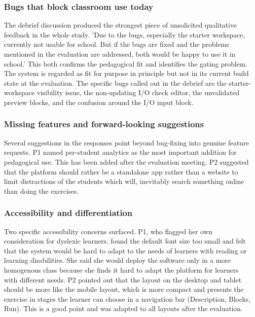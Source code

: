 \subsubsection*{Bugs that block classroom use today}
The debrief discussion produced the strongest piece of unsolicited qualitative feedback in the whole study.
'Due to the bugs, especially the starter workspace, currently not usable for school. But if the bugs are fixed and the 
problems mentioned in the evaluation are addressed, both would be happy to use it in school.' 
This both confirms the pedagogical fit and identifies the gating problem.
The system is regarded as fit for purpose in principle but not in its current build state at the evaluation. 
The specific bugs called out in the debrief are the starter-workspace visibility issue, the non-updating I/O check editor, 
the unvalidated preview blocks, and the confusion around the I/O input block.

\subsubsection*{Missing features and forward-looking suggestions}
Several suggestions in the responses point beyond bug-fixing into genuine feature requests. 
P1 named per-student analytics as the most important addition
for pedagogical use. This has been added after the evaluation meeting.
P2 suggested that the platform should rather be a standalone app rather than a website to 
limit distractions of the students which will, inevitably search something online
than doing the exercises.

\subsubsection*{Accessibility and differentiation}
Two specific accessibility concerns surfaced. P1, who flagged her own consideration for
dyslexic learners, found the default font size too small and felt that the system
would be hard to adapt to the needs of learners with reading or learning
disabilities. She said she would deploy the software only in a more
homogenous class because she finds it hard to adapt the platform
for learners with different needs.
P2 pointed out that the layout on the desktop and tablet should be more like
the mobile layout, which is more compact and presents the
exercise in stages the learner can choose in a navigation bar (Description, Blocks, Run).
This is a good point and was adapted to all layouts after the evaluation.


